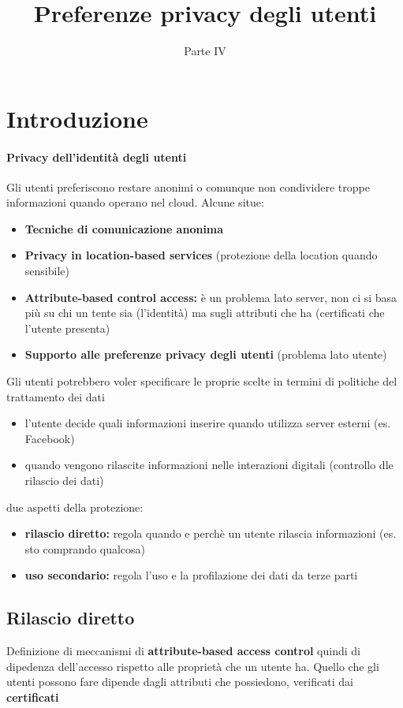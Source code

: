 \documentclass{report}
\title{Preferenze privacy degli utenti}
\date{Parte IV}
\begin{document}
\maketitle

\tableofcontents
\newpage

\chapter{Introduzione}
\subsubsection{Privacy dell'identità degli utenti}
Gli utenti preferiscono restare anonimi o comunque non condividere troppe informazioni quando
operano nel cloud.
Alcune situe:
\begin{itemize}
    \item \textbf{Tecniche di comunicazione anonima}
    \item \textbf{Privacy in location-based services} (protezione della location quando sensibile)
    \item \textbf{Attribute-based control access:} è un problema lato server, non ci si basa più su chi un tente sia (l'identità)
        ma sugli attributi che ha (certificati che l'utente presenta)
    \item \textbf{Supporto alle preferenze privacy degli utenti} (problema lato utente)
\end{itemize}

Gli utenti potrebbero voler specificare le proprie scelte in termini di politiche del trattamento dei dati
\begin{itemize}
    \item l'utente decide quali informazioni inserire quando utilizza server esterni (es. Facebook)
    \item quando vengono rilascite informazioni nelle interazioni digitali (controllo dle rilascio dei dati)
\end{itemize}

due aspetti della protezione:
\begin{itemize}
    \item \textbf{rilascio diretto:} regola quando e perchè un utente rilascia informazioni (es. sto comprando qualcosa)
    \item \textbf{uso secondario:} regola l'uso e la profilazione dei dati da terze parti
\end{itemize}

\section{Rilascio diretto}
Definizione di meccanismi di \textbf{attribute-based access control} quindi di dipedenza dell'accesso rispetto alle proprietà che un utente ha.
Quello che gli utenti possono fare dipende dagli attributi che possiedono, verificati dai \textbf{certificati}
\end{document}

